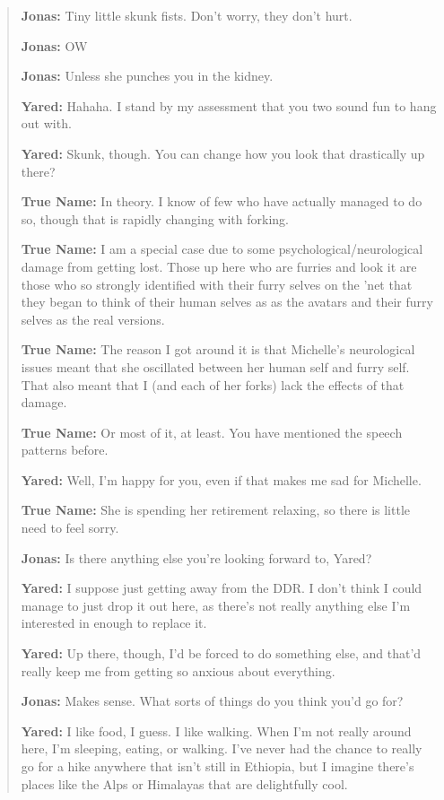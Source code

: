 \begin{quote}
\textbf{Jonas:} Tiny little skunk fists. Don't worry, they don't hurt.

\textbf{Jonas:} OW

\textbf{Jonas:} Unless she punches you in the kidney.

\textbf{Yared:} Hahaha. I stand by my assessment that you two sound fun to hang out with.

\textbf{Yared:} Skunk, though. You can change how you look that drastically up there?

\textbf{True Name:} In theory. I know of few who have actually managed to do so, though that is rapidly changing with forking.

\textbf{True Name:} I am a special case due to some psychological/neurological damage from getting lost. Those up here who are furries and look it are those who so strongly identified with their furry selves on the 'net that they began to think of their human selves as as the avatars and their furry selves as the real versions.

\textbf{True Name:} The reason I got around it is that Michelle's neurological issues meant that she oscillated between her human self and furry self. That also meant that I (and each of her forks) lack the effects of that damage.

\textbf{True Name:} Or most of it, at least. You have mentioned the speech patterns before.

\textbf{Yared:} Well, I'm happy for you, even if that makes me sad for Michelle.

\textbf{True Name:} She is spending her retirement relaxing, so there is little need to feel sorry.

\textbf{Jonas:} Is there anything else you're looking forward to, Yared?

\textbf{Yared:} I suppose just getting away from the DDR. I don't think I could manage to just drop it out here, as there's not really anything else I'm interested in enough to replace it.

\textbf{Yared:} Up there, though, I'd be forced to do something else, and that'd really keep me from getting so anxious about everything.

\textbf{Jonas:} Makes sense. What sorts of things do you think you'd go for?

\textbf{Yared:} I like food, I guess. I like walking. When I'm not really around here, I'm sleeping, eating, or walking. I've never had the chance to really go for a hike anywhere that isn't still in Ethiopia, but I imagine there's places like the Alps or Himalayas that are delightfully cool.


\end{quote}
